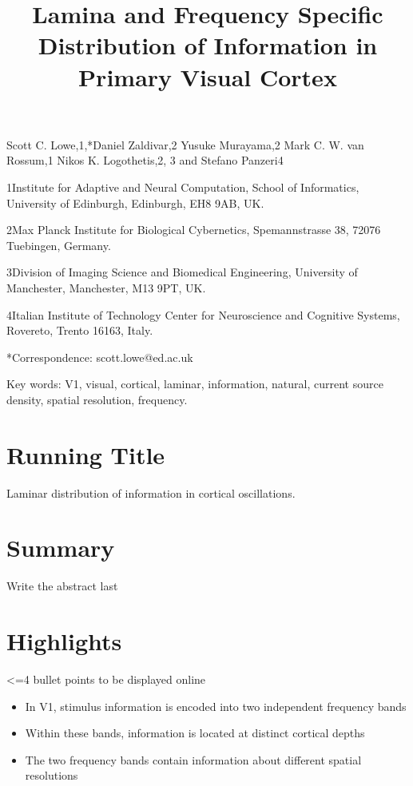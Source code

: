 \documentclass{article}
\title{}
\begin{document}
\title{Lamina and Frequency Specific Distribution of Information in Primary Visual Cortex}
\maketitle

Scott C. Lowe,1,*Daniel Zaldivar,2 Yusuke Murayama,2 Mark C. W. van Rossum,1 Nikos K. Logothetis,2, 3 and Stefano Panzeri4

1Institute for Adaptive and Neural Computation, School of Informatics, University of Edinburgh, Edinburgh, EH8 9AB, UK.

2Max Planck Institute for Biological Cybernetics, Spemannstrasse 38, 72076 Tuebingen, Germany.

3Division of Imaging Science and Biomedical Engineering, University of Manchester, Manchester, M13 9PT, UK.

4Italian Institute of Technology Center for Neuroscience and Cognitive Systems, Rovereto, Trento 16163, Italy.

*Correspondence: scott.lowe@ed.ac.uk

Key words: V1, visual, cortical, laminar, information, natural, current source density, spatial resolution, frequency.

\section{Running Title}
Laminar distribution of information in cortical oscillations.

\section{Summary}
Write the abstract last

\section{Highlights}
{\textless}=4 bullet points to be displayed online

\begin{itemize}
\item In V1, stimulus information is encoded into two independent frequency bands 
\item Within these bands, information is located at distinct cortical depths
\item The two frequency bands contain information about different spatial resolutions
\end{itemize}
\end{document}
